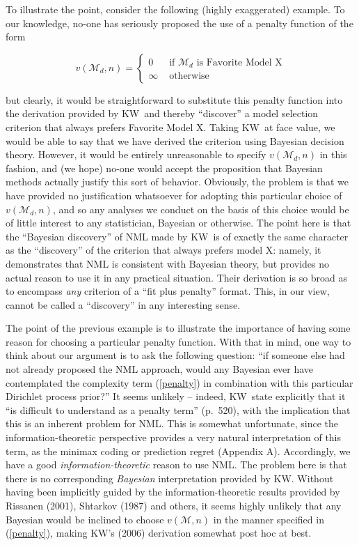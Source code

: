 \documentclass[authoryear]{elsarticle}
\newcommand{\model}{\mathcal{M}}
\newcommand{\kw}{KW}
\begin{document}
To illustrate the point, consider the following (highly exaggerated)
example. To our knowledge, no-one has seriously proposed the use
of a penalty function of the form

\vspace*{-12pt}
\begin{equation}
v(\model_d,n)= \left\{ \begin{array}{rl} 0 & \mbox{ if $\model_d$ is
Favorite Model X} \\
\infty & \mbox{ otherwise} \end{array} \right.
\end{equation}

but clearly, it would be straightforward to substitute this penalty function
into the derivation provided by \kw\ and thereby
  ``discover'' a model selection criterion that always
prefers Favorite Model X. Taking \kw\ at face value, we would
be able to say that we have derived the criterion using Bayesian
decision theory. However, it would be entirely unreasonable
to specify $v(\model_d,n)$ in this fashion, and (we hope) no-one
would accept the proposition that Bayesian methods actually justify
this sort of behavior. Obviously, the problem is that we have provided
no justification whatsoever for adopting this particular choice of
$v(\model_d,n)$, and so any analyses we conduct on the basis of
this choice would be of little interest to any statistician, Bayesian or
otherwise. The point here is that the ``Bayesian discovery'' of NML
made by \kw\ is of exactly the same character as the ``discovery''
of the criterion that always prefers model X: namely, it demonstrates
that NML is consistent with Bayesian theory, but provides no
actual reason to use it in any practical situation. Their derivation is
so broad as to encompass {\it any} criterion of a ``fit plus penalty''
format. This, in our view,
cannot be called a ``discovery'' in any interesting sense.

The point of the previous example is to illustrate the importance
of having some reason for choosing a particular penalty function.
With that in mind, one way to think about our argument is to ask
the following question: ``if
someone else had not already proposed the NML approach, would any
Bayesian ever have contemplated the complexity term (\ref{penalty})
in combination with this particular Dirichlet process prior?'' It seems
unlikely -- indeed, \kw\ state
explicitly that it ``is difficult to understand as a penalty term''
(p.\ 520), with the implication that this is an inherent problem for
NML. This is somewhat unfortunate, since the information-theoretic
perspective provides a very natural interpretation of this term,
 as the minimax coding or prediction regret (Appendix A).
 Accordingly,  we have a good
{\it information-theoretic} reason to use NML.  The problem
here is that there is no corresponding
{\it Bayesian} interpretation provided by \kw. Without having been
implicitly guided by the information-theoretic results provided by
Rissanen (2001), Shtarkov (1987) and others, it seems highly unlikely
that any Bayesian would be inclined to choose $v(\model,n)$ in the
manner specified in (\ref{penalty}),
making \kw's (2006) derivation somewhat post hoc at best.
\end{document}
